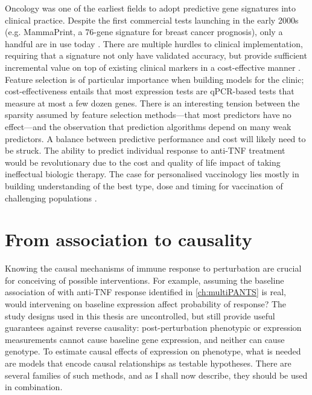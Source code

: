 Oncology was one of the earliest fields to adopt predictive gene signatures into clinical practice.
Despite the first commercial tests launching in the early 2000s (e.g. MammaPrint, a 76-gene signature for breast cancer prognosis),
only a handful are in use today \autocite{chibon2013CancerGeneExpression,michiels2016StatisticalControversiesClinical,kwa2017ClinicalUtilityGeneexpression}. 
There are multiple hurdles to clinical implementation,
requiring that a signature not only have validated accuracy, 
but provide sufficient incremental value on top of existing clinical markers in a cost-effective manner \autocite{michiels2016StatisticalControversiesClinical}.
Feature selection is of particular importance when building models for the clinic; 
cost-effectiveness entails that most expression tests are qPCR-based tests that measure at most a few dozen genes.
There is an interesting tension between the sparsity assumed by feature selection methods---that most predictors have no effect---and the observation that prediction algorithms depend on many weak predictors.
A balance between predictive performance and cost will likely need to be struck.
The ability to predict individual response to anti-\gls{TNF} treatment would be revolutionary due to the cost and quality of life impact of taking ineffectual biologic therapy.
The case for personalised vaccinology lies mostly in building understanding of the best type, dose and timing for vaccination of challenging populations \autocite{poland2018PersonalizedVaccinologyReview}.

%

\section{From association to causality}

Knowing the causal mechanisms of immune response to perturbation are crucial for conceiving of possible interventions.
For example, assuming the baseline association of  with anti-\gls{TNF} response identified in \cref{ch:multiPANTS} is real,
would intervening on baseline  expression affect probability of response?
The study designs used in this thesis are uncontrolled, but still provide useful guarantees against reverse causality:
post-perturbation phenotypic or expression measurements cannot cause baseline gene expression,
and neither can cause genotype.
To estimate causal effects of expression on phenotype,
what is needed are models that encode causal relationships as testable hypotheses.
There are several families of such methods, and as I shall now describe, they should be used in combination.

